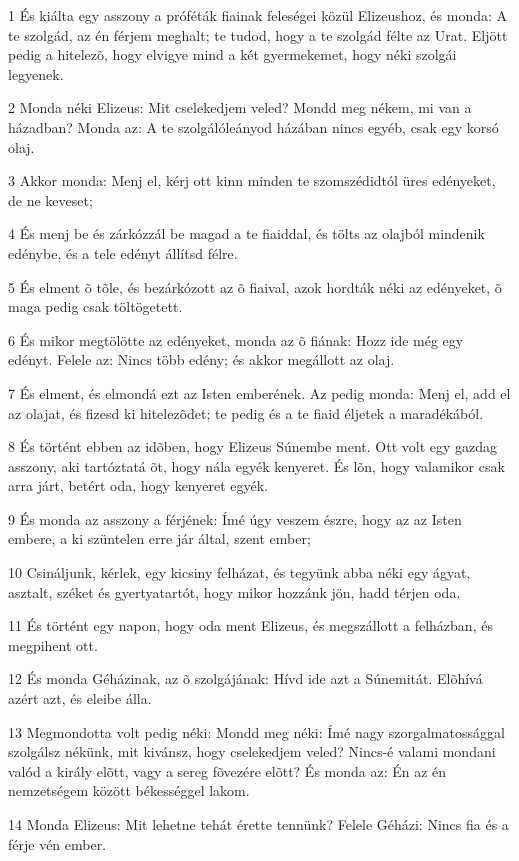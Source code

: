 \par 1 És kiálta egy asszony a próféták fiainak feleségei közül Elizeushoz, és monda: A te szolgád, az én férjem meghalt; te tudod, hogy a te szolgád félte az Urat. Eljött pedig a hitelezõ, hogy elvigye mind a két gyermekemet, hogy néki szolgái legyenek.
\par 2 Monda néki Elizeus: Mit cselekedjem veled? Mondd meg nékem, mi van a házadban? Monda az: A te szolgálóleányod házában nincs egyéb, csak egy korsó olaj.
\par 3 Akkor monda: Menj el, kérj ott kinn minden te szomszédidtól üres edényeket, de ne keveset;
\par 4 És menj be és zárkózzál be magad a te fiaiddal, és tölts az olajból mindenik edénybe, és a tele edényt állítsd félre.
\par 5 És elment õ tõle, és bezárkózott az õ fiaival, azok hordták néki az edényeket, õ maga pedig csak töltögetett.
\par 6 És mikor megtölötte az edényeket, monda az õ fiának: Hozz ide még egy edényt. Felele az: Nincs több edény; és akkor megállott az olaj.
\par 7 És elment, és elmondá ezt az Isten emberének. Az pedig monda: Menj el, add el az olajat, és fizesd ki hitelezõdet; te pedig és a te fiaid éljetek a maradékából.
\par 8 És történt ebben az idõben, hogy Elizeus Súnembe ment. Ott volt egy gazdag asszony, aki tartóztatá õt, hogy nála egyék kenyeret. És lõn, hogy valamikor csak arra járt, betért oda, hogy kenyeret egyék.
\par 9 És monda az asszony a férjének: Ímé úgy veszem észre, hogy az az Isten embere, a ki szüntelen erre jár által, szent ember;
\par 10 Csináljunk, kérlek, egy kicsiny felházat, és tegyünk abba néki egy ágyat, asztalt, széket és gyertyatartót, hogy mikor hozzánk jön, hadd térjen oda.
\par 11 És történt egy napon, hogy oda ment Elizeus, és megszállott a felházban, és megpihent ott.
\par 12 És monda Géházinak, az õ szolgájának: Hívd ide azt a Súnemitát. Elõhívá azért azt, és eleibe álla.
\par 13 Megmondotta volt pedig néki: Mondd meg néki: Ímé nagy szorgalmatossággal szolgálsz nékünk, mit kivánsz, hogy cselekedjem veled? Nincs-é valami mondani valód a király elõtt, vagy a sereg fõvezére elõtt? És monda az: Én az én nemzetségem között békességgel lakom.
\par 14 Monda Elizeus: Mit lehetne tehát érette tennünk? Felele Géházi: Nincs fia és a férje vén ember.
